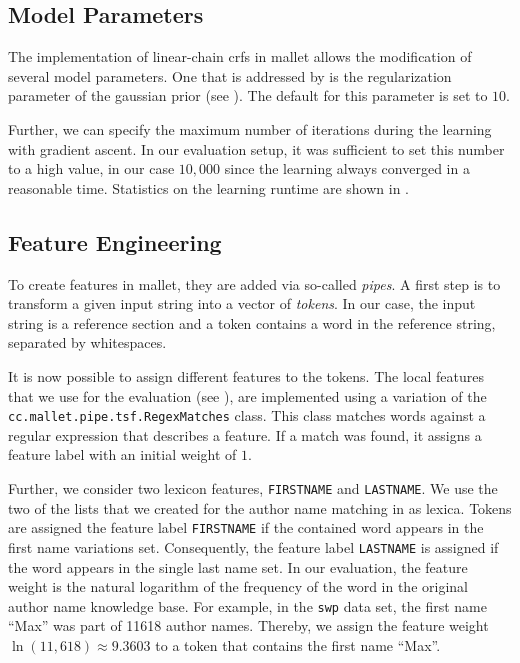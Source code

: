 \subsection{Model Parameters}\label{subsec:i-model-parameters}

The implementation of \glspl{linear-chain crf} in \gls{mallet} allows the modification of several model parameters.
One that is addressed by  is the regularization parameter of the \gls{gaussian prior} (see ).
The default for this parameter is set to $10$.

Further, we can specify the maximum number of iterations during the learning with gradient ascent.
In our evaluation setup, it was sufficient to set this number to a high value, in our case $10,000$ since the learning always converged in a reasonable time.
Statistics on the learning runtime are shown in .

\subsection{Feature Engineering}\label{subsec:i-feature-engineering}

To create features in \gls{mallet}, they are added via so-called \textit{pipes}.
A first step is to transform a given input string into a vector of \textit{tokens}.
In our case, the input string is a reference section and a token contains a word in the reference string, separated by whitespaces.

It is now possible to assign different features to the tokens.
The local features that we use for the evaluation (see ), are implemented using a variation of the \texttt{cc.mallet.pipe.tsf.RegexMatches} class.
This class matches words against a regular expression that describes a feature.
If a match was found, it assigns a feature label with an initial weight of $1$.

Further, we consider two lexicon features, \texttt{FIRSTNAME} and \texttt{LASTNAME}.
We use the two of the lists that we created for the author name matching in  as lexica.
Tokens are assigned the feature label \texttt{FIRSTNAME} if the contained word appears in the first name variations set.
  Consequently, the feature label \texttt{LASTNAME} is assigned if the word appears in the single last name set.
In our evaluation, the feature weight is the natural logarithm of the frequency of the word in the original author name knowledge base.
For example, in the \texttt{swp} data set, the first name ``Max'' was part of \num{11618} author names.
Thereby, we assign the feature weight $\ln(11,618)\approx9.3603$ to a token that contains the first name ``Max''.

